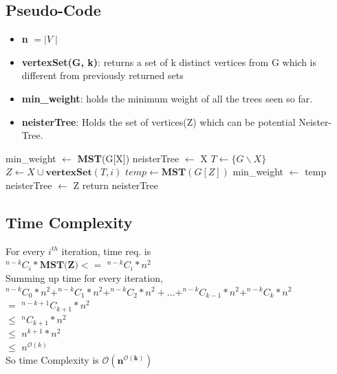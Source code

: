 \documentclass{article}
\begin{document}
\subsection{Pseudo-Code}
\begin{itemize} \itemsep -3pt
        \item \textbf{n} $= \mid V\mid$ 
        \item \textbf{vertexSet(G, k)}: returns a set of k distinct vertices from G which is different from previously returned sets
        \item \textbf{min\_weight}: holds the minimum weight of all the trees seen so far.
        \item \textbf{neisterTree}: Holds the set of vertices(Z) which can be potential Neister-Tree.    
\end{itemize}
\begin{algorithmic}[1]
\State min\_weight $\gets$ \textbf{MST}(G[X])
\State neisterTree $\gets$ X
\State $T \gets \{G\backslash X\}$
\State $Z \gets X\cup \textbf{vertexSet}(T,i)$ 
\State $temp \gets \textbf{MST}(G[Z])$
\State min\_weight $\gets$ temp
\State neisterTree $\gets$ Z
\EndIf
\EndFor
\EndFor
\State return neisterTree
\EndProcedure
\end{algorithmic}

\subsection{Time Complexity}
For every $i^{th}$ iteration, time req. is \\
\hspace*{1cm}$^{n-k} C_i *\textbf{MST(Z)}  <=$  $^{n-k} C_i * n^2$\\
Summing up time for every iteration,\\
\hspace*{1.2cm} $^{n-k} C_0 * n^2 + ^{n-k} C_1 * n^2 + ^{n-k} C_2 * n^2 + ... +  ^{n-k} C_{k-1} * n^2 + ^{n-k} C_k * n^2$\\
\hspace*{1cm} $=$ $ ^{n-k+1} C_{k+1} * n^2 $\\
\hspace*{1cm} $\leq$ $^{n} C_{k+1} * n^2 $\\
\hspace*{1cm} $\leq$ $n^{k+1}  * n^2 $\\
\hspace*{1cm} $\leq$ $n^{\mathcal{O}(k)}$\\
\hspace*{1cm} So time Complexity is $\boldsymbol{\mathcal{O}(n^{\mathcal{O}(k)})}$\\
\end{document}
